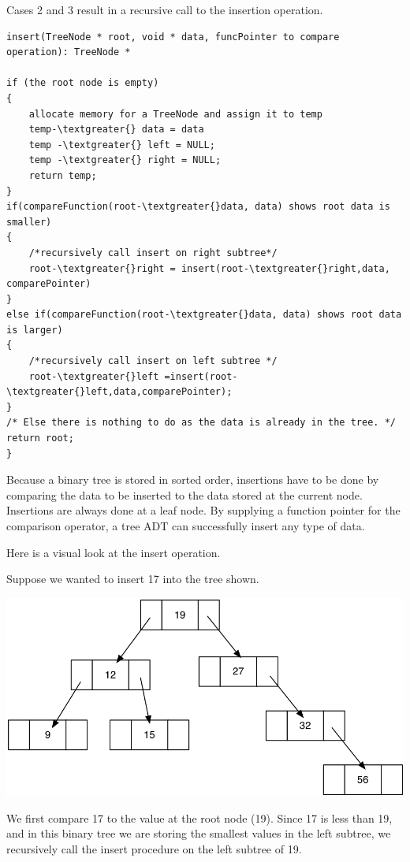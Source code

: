 Cases 2 and 3 result in a recursive call to the insertion operation.

\begin{lstlisting}
insert(TreeNode * root, void * data, funcPointer to compare operation): TreeNode *

if (the root node is empty)
{
	allocate memory for a TreeNode and assign it to temp
	temp-\textgreater{} data = data
	temp -\textgreater{} left = NULL;
	temp -\textgreater{} right = NULL;
	return temp;
}
if(compareFunction(root-\textgreater{}data, data) shows root data is smaller)
{
	/*recursively call insert on right subtree*/
	root-\textgreater{}right = insert(root-\textgreater{}right,data, comparePointer)
}
else if(compareFunction(root-\textgreater{}data, data) shows root data is larger)
{
	/*recursively call insert on left subtree */
	root-\textgreater{}left =insert(root-\textgreater{}left,data,comparePointer);
}
/* Else there is nothing to do as the data is already in the tree. */
return root;
}
\end{lstlisting}


Because a binary tree is stored in sorted order, insertions have to be
done by comparing the data to be inserted to the data stored at the
current node. Insertions are always done at a leaf node. By supplying a
function pointer for the comparison operator, a tree ADT can
successfully insert any type of data.

Here is a visual look at the insert operation.

Suppose we wanted to insert 17 into the tree shown.

\includegraphics[width=6.00000in]{pictures/bintree1.png}

We first compare 17 to the value at the root node (19). Since 17 is
less than 19, and in this binary tree we are storing the smallest values in the left subtree,  we recursively call the insert procedure on the left
subtree of 19.

